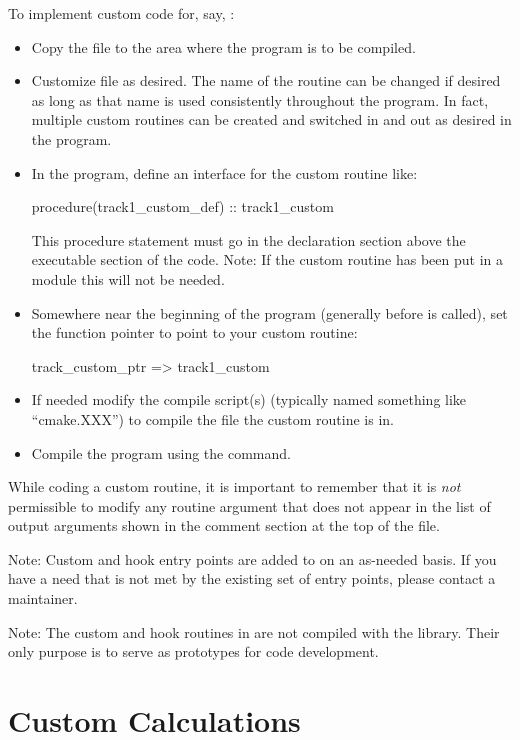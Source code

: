 To implement custom code for, say, :
\begin{itemize}
%
\item 
Copy the file  to the area where the program is to be compiled.
%
\item
Customize file as desired. The name of the routine can be changed if desired as long as that name is used
consistently throughout the program. In fact, multiple custom
routines can be created and switched in and out as desired in the program.
%
\item
In the program, define an interface for the custom routine like:
\begin{example}
  procedure(track1_custom_def) :: track1_custom
\end{example}
This procedure statement must go in the declaration section above the executable section of the code.
Note: If the custom routine has been put in a module this will not be needed.
%
\item
Somewhere near the beginning of the program (generally before  is called), set the
function pointer to point to your custom routine:
\begin{example}
  track_custom_ptr => track1_custom
\end{example}
%
\item
If needed modify the compile script(s) (typically named something like ``cmake.XXX'') to compile the
file the custom routine is in.
%
\item
Compile the program using the  command.
%
\end{itemize}

While coding a custom routine, it is important to remember that it is {\em not} permissible to
modify any routine argument that does not appear in the list of output arguments shown in the
comment section at the top of the file.

Note: Custom and hook entry points are added to \bmad on an as-needed basis. If you have a need that
is not met by the existing set of entry points, please contact a \bmad maintainer.

Note: The custom and hook routines in  are not compiled with the \bmad library. Their
only purpose is to serve as prototypes for code development.

\section{Custom Calculations}
\label{s:custom.ele}

